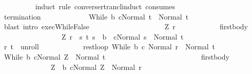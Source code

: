 \begin{isabellebody}
\ \ \ \ \ \ \ \ \isamarkupfalse%
\ {\isacharparenleft}induct\ rule{\isacharcolon}\ converse{\isacharunderscore}rtrancl{\isacharunderscore}induct\ {\isacharbrackleft}consumes\ {}{\isacharbrackright}{\isacharparenright}\isanewline
\ \ \ \ \ \ \ \ \ \ \isamarkupfalse%
\ {\isachardoublequoteopen}termination{\isachardoublequoteclose}\ \isanewline
\ \ \ \ \ \ \ \ \ \ \isamarkupfalse%
\ {\isachardoublequoteopen}{\isasymGamma}{\isasymturnstile}{\isasymlangle}While\ b\ c{\isacharcomma}Normal\ t{\isasymrangle}\ {\isasymRightarrow}\ Normal\ t{\isachardoublequoteclose}\isanewline
\ \ \ \ \ \ \ \ \ \ \ \ \isamarkupfalse%
\ {\isacharparenleft}blast\ intro{\isacharcolon}\ exec{\isachardot}WhileFalse{\isacharparenright}\isanewline
\ \ \ \ \ \ \ \ \isamarkupfalse%
\isanewline
\ \ \ \ \ \ \ \ \ \ \isamarkupfalse%
\ Z\ r\isanewline
\ \ \ \ \ \ \ \ \ \ \isamarkupfalse%
\ first{\isacharunderscore}body{\isacharcolon}\ \isanewline
\ \ \ \ \ \ \ \ \ \ \ \ \ \ \ \ \ {\isachardoublequoteopen}{\isacharparenleft}Z{\isacharcomma}\ r{\isacharparenright}\ {\isasymin}\ {\isacharbraceleft}{\isacharparenleft}s{\isacharcomma}\ t{\isacharparenright}{\isachardot}\ s\ {\isasymin}\ b\ {\isasymand}\ {\isasymGamma}{\isasymturnstile}{\isasymlangle}c{\isacharcomma}Normal\ s{\isasymrangle}\ {\isasymRightarrow}\ Normal\ t{\isacharbraceright}{\isachardoublequoteclose}\isanewline
\ \ \ \ \ \ \ \ \ \ \isamarkupfalse%
\ {\isachardoublequoteopen}{\isacharparenleft}r{\isacharcomma}\ t{\isacharparenright}\ {\isasymin}\ {\isacharquery}unroll{\isachardoublequoteclose}\isanewline
\ \ \ \ \ \ \ \ \ \ \isamarkupfalse%
\ rest{\isacharunderscore}loop{\isacharcolon}\ {\isachardoublequoteopen}{\isasymGamma}{\isasymturnstile}{\isasymlangle}While\ b\ c{\isacharcomma}\ Normal\ r{\isasymrangle}\ {\isasymRightarrow}\ Normal\ t{\isachardoublequoteclose}\isanewline
\ \ \ \ \ \ \ \ \ \ \isamarkupfalse%
\ {\isachardoublequoteopen}{\isasymGamma}{\isasymturnstile}{\isasymlangle}While\ b\ c{\isacharcomma}Normal\ Z{\isasymrangle}\ {\isasymRightarrow}\ Normal\ t{\isachardoublequoteclose}\isanewline
\ \ \ \ \ \ \ \ \ \ \isamarkupfalse%
\ {\isacharminus}\isanewline
\ \ \ \ \ \ \ \ \ \ \ \ \isamarkupfalse%
\ first{\isacharunderscore}body\ \isamarkupfalse%
\isanewline
\ \ \ \ \ \ \ \ \ \ \ \ \ \ {\isachardoublequoteopen}Z\ {\isasymin}\ b{\isachardoublequoteclose}\ {\isachardoublequoteopen}{\isasymGamma}{\isasymturnstile}{\isasymlangle}c{\isacharcomma}Normal\ Z{\isasymrangle}\ {\isasymRightarrow}\ Normal\ r{\isachardoublequoteclose}\isanewline

\end{isabellebody}
